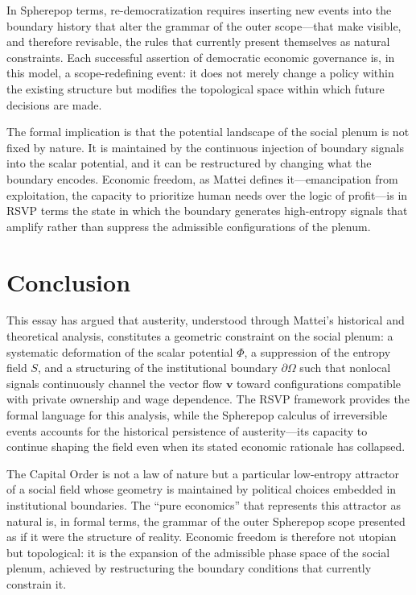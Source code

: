 \documentclass[12pt,a4paper]{article}
\begin{document}
In Spherepop terms, re-democratization requires inserting new events into the boundary history that alter the grammar of the outer scope---that make visible, and therefore revisable, the rules that currently present themselves as natural constraints. Each successful assertion of democratic economic governance is, in this model, a scope-redefining event: it does not merely change a policy within the existing structure but modifies the topological space within which future decisions are made.

The formal implication is that the potential landscape of the social plenum is not fixed by nature. It is maintained by the continuous injection of boundary signals into the scalar potential, and it can be restructured by changing what the boundary encodes. Economic freedom, as Mattei defines it---emancipation from exploitation, the capacity to prioritize human needs over the logic of profit---is in RSVP terms the state in which the boundary generates high-entropy signals that amplify rather than suppress the admissible configurations of the plenum.

\section{Conclusion}

This essay has argued that austerity, understood through Mattei's historical and theoretical analysis, constitutes a geometric constraint on the social plenum: a systematic deformation of the scalar potential $\Phi$, a suppression of the entropy field $S$, and a structuring of the institutional boundary $\partial\Omega$ such that nonlocal signals continuously channel the vector flow $\mathbf{v}$ toward configurations compatible with private ownership and wage dependence. The RSVP framework provides the formal language for this analysis, while the Spherepop calculus of irreversible events accounts for the historical persistence of austerity---its capacity to continue shaping the field even when its stated economic rationale has collapsed.

The Capital Order is not a law of nature but a particular low-entropy attractor of a social field whose geometry is maintained by political choices embedded in institutional boundaries. The ``pure economics'' that represents this attractor as natural is, in formal terms, the grammar of the outer Spherepop scope presented as if it were the structure of reality. Economic freedom is therefore not utopian but topological: it is the expansion of the admissible phase space of the social plenum, achieved by restructuring the boundary conditions that currently constrain it.
\end{document}

